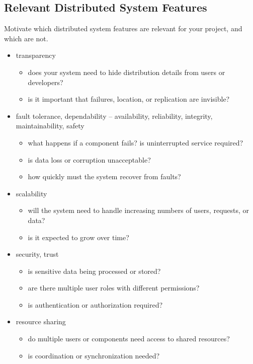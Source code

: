 \documentclass{scrartcl}
\newenvironment{guideline}[1][gray]{\color{#1}}{}
\begin{document}
  \subsection{Relevant Distributed System Features}\label{ds-features}

  \begin{guideline}
  Motivate which distributed system features are relevant for your project, and which are not.
  \begin{itemize}
    \item transparency
    \begin{itemize}
      \item does your system need to hide distribution details from users or developers?
      \item is it important that failures, location, or replication are invisible?
    \end{itemize}

    \item fault tolerance, dependability -- availability, reliability, integrity, maintainability, safety
    \begin{itemize}
      \item what happens if a component fails? is uninterrupted service required?
      \item is data loss or corruption unacceptable?
      \item how quickly must the system recover from faults?
    \end{itemize}

    \item scalability
    \begin{itemize}
      \item will the system need to handle increasing numbers of users, requests, or data?
      \item is it expected to grow over time?
    \end{itemize}

    \item security, trust
    \begin{itemize}
      \item is sensitive data being processed or stored?
      \item are there multiple user roles with different permissions?
      \item is authentication or authorization required?
    \end{itemize}

    \item resource sharing
    \begin{itemize}
      \item do multiple users or components need access to shared resources?
      \item is coordination or synchronization needed?
    \end{itemize}


\end{itemize}
\end{guideline}
\end{document}
